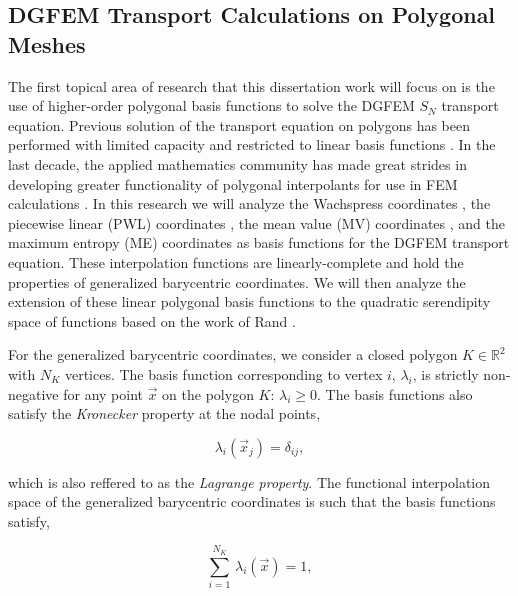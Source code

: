 \documentclass[11pt]{article}
\begin{document}
\subsection{DGFEM Transport Calculations on Polygonal Meshes}
\label{sec::CW_poly}

The first topical area of research that this dissertation work will focus on is the use of higher-order polygonal basis functions to solve the DGFEM $S_N$ transport equation. Previous solution of the transport equation on polygons has been performed with limited capacity and restricted to linear basis functions \cite{davidson2008finite,ref::PWLD_stone_adams,ref::PWLD_stone_adams_unstructured}. In the last decade, the applied mathematics community has made great strides in developing greater functionality of polygonal interpolants for use in FEM calculations \cite{sukumar2006recent,manzini2014new}. In this research we will analyze the Wachspress coordinates \cite{wachspress1975rational}, the piecewise linear (PWL) coordinates \cite{ref::PWLD_stone_adams}, the mean value (MV) coordinates \cite{floater2003mean,hormann2006mean}, and the maximum entropy (ME) coordinates \cite{sukumar2004construction,sukumar2005maximum,hormann2008maximum} as basis functions for the DGFEM transport equation. These interpolation functions are linearly-complete and hold the properties of generalized barycentric coordinates. We will then analyze the extension of these linear polygonal basis functions to the quadratic serendipity space of functions based on the work of Rand \cite{rand2013interpolation}.

For the generalized barycentric coordinates, we consider a closed polygon $K \in \mathbb{R}^2$ with $N_K$ vertices. The basis function corresponding to vertex $i$, $\lambda_i$, is strictly non-negative for any point $\vec{x}$ on the polygon $K$: $\lambda_i \geq 0$. The basis functions also satisfy the {\em Kronecker} property at the nodal points, 

\begin{equation}
\label{eq::Lin_constant_constraint}
\lambda_i(\vec{x}_j) = \delta_{ij} ,
\end{equation}

\noindent which is also reffered to as the {\em Lagrange property}. The functional interpolation space of the generalized barycentric coordinates is such that the basis functions satisfy,

\begin{equation}
\label{eq::Lin_constant_constraint}
\sum_{i=1}^{N_K} \, \lambda_i(\vec{x}) = 1 ,
\end{equation}
\end{document}
